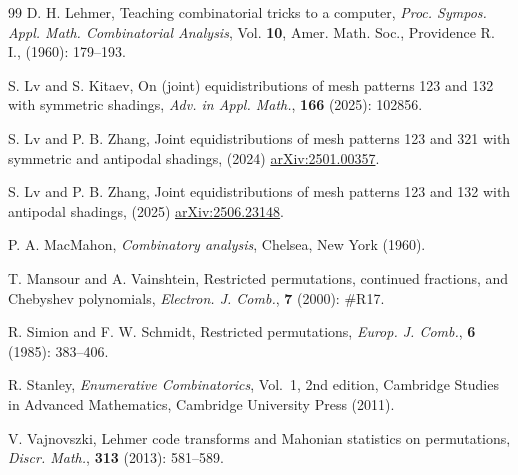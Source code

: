 \documentclass[12pt,reqno]{article}
\numberwithin{equation}{section}
\theoremstyle{plain}
\theoremstyle{definition}
\begin{document}
\begin{thebibliography}{99}
 D. H. Lehmer, Teaching combinatorial tricks to a computer, {\it Proc. Sympos. Appl. Math. Combinatorial Analysis}, Vol. {\bf10}, Amer. Math. Soc., Providence R. I., (1960): 179--193.

 S. Lv and S. Kitaev, On (joint) equidistributions of mesh patterns 123 and 132 with symmetric shadings, \emph{Adv. in Appl. Math.}, {\bf166} (2025): 102856.

 S. Lv and P. B. Zhang, Joint equidistributions of mesh patterns 123 and 321 with symmetric and antipodal shadings, (2024) \href{https://arxiv.org/abs/2501.00357}{arXiv:2501.00357}.

 S. Lv and P. B. Zhang, Joint equidistributions of mesh patterns 123 and 132 with antipodal shadings, (2025) \href{https://arxiv.org/abs/2506.23148}{arXiv:2506.23148}.

 P. A. MacMahon, {\it Combinatory analysis}, Chelsea, New York (1960).

 T. Mansour and A. Vainshtein, Restricted permutations, continued fractions, and Chebyshev polynomials, {\it Electron. J. Comb.}, {\bf7} (2000): \#R17.

 R. Simion and F. W. Schmidt, Restricted permutations, {\it Europ. J. Comb.}, {\bf6} (1985): 383--406.

R. Stanley, {\it Enumerative Combinatorics}, Vol.~1, 2nd edition, Cambridge Studies in Advanced Mathematics, Cambridge University Press (2011). 

V. Vajnovszki, Lehmer code transforms and Mahonian statistics on permutations, {\it Discr. Math.}, {\bf313} (2013): 581--589.


\end{thebibliography}
\end{document}

